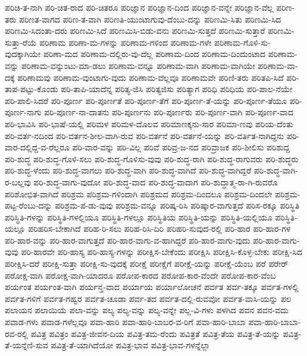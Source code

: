 {ಪರಿಚಿ-ತ-ನಾಗಿ
ಪರಿ-ಚಿತ-ರಾದ
ಪರಿ-ಚಿತರೂ
ಪರಿಜ್ಞಾನ
ಪರಿಜ್ಞಾನ-ದಿಂದ
ಪರಿಜ್ಞಾನ-ವನ್ನೇ
ಪರಿಜ್ಞಾನ-ವೆಲ್ಲ
ಪರಿಣ-ತರು
ಪರಿಣತ-ವಾಗದ
ಪರಿಣ-ತ-ವಾಗಿ
ಪರಿಣತಿ-ಯುಂಟಾಗುವು-ದೆಂಬು-ದನ್ನು
ಪರಿಣಮಿ-ಸಿತು
ಪರಿಣಮಿ-ಸಿದ
ಪರಿಣಮಿ-ಸಿದಂತಾ-ದರು
ಪರಿಣಮಿ-ಸಿದೆ
ಪರಿಣಮಿಸಿ-ಬಿಡು-ವನು
ಪರಿಣಮಿ-ಸುತ್ತದೆ
ಪರಿಣಮಿ-ಸುತ್ತಾರೆ
ಪರಿಣಮಿ-ಸುತ್ತಾ-ರೆಯೆ
ಪರಿಣಾಮ
ಪರಿಣಾ-ಮ-ಗಳನ್ನು
ಪರಿಣಾಮ-ಗಳಿಂದ
ಪರಿಣಾಮ-ಗಳೇ
ಪರಿಣಾಮ-ಗೊಳಿ-ಸು-ವುದಕ್ಕಾಗಿಯೇ
ಪರಿಣಾ-ಮದ
ಪರಿಣಾಮ-ದಲ್ಲಿರು-ವು-ದೆಲ್ಲ
ಪರಿಣಾಮ-ದಿಂದ
ಪರಿಣಾಮ-ದಿಂದುಂಟಾದ
ಪರಿಣಾಮ-ವನ್ನು
ಪರಿಣಾಮ-ವನ್ನುಂಟು-ಮಾ-ಡಲು
ಪರಿಣಾಮ-ವನ್ನೂ
ಪರಿಣಾಮ-ವಾಗಿ
ಪರಿಣಾಮ-ವಾಗಿಯೇ
ಪರಿಣಾಮ-ವಾ-ದಕ್ಕೆ
ಪರಿಣಾಮವು
ಪರಿಣಾಮ-ವುಂಟಾಗು-ವುದು
ಪರಿಣಾಮ-ವೆಲ್ಲವೂ
ಪರಿಣಾಮವೇ
ಪರಿಣಿ-ತರು
ಪರಿತಪಿ-ಸಿದೆ
ಪರಿ-ತಾಪ-ಪಟ್ಟು-ಕೊಂಡು
ಪರಿ-ತಾಪಿ-ಯಾದೆನ್ನ
ಪರಿತ್ಯ-ಜಿಸಿ
ಪರಿತ್ಯಜಿಸು
ಪರಿತ್ಯಾಗ
ಪರಿಧಿ
ಪರಿಧಿಯ
ಪರಿ-ಪಾಲ-ನೆಯೇ
ಪರಿ-ಪಾಲಿ-ಸಿದರೆ
ಪರಿ-ಪೂರ್ಣ
ಪರಿ-ಪೂರ್ಣತೆ
ಪರಿ-ಪೂರ್ಣ-ತೆಗೆ
ಪರಿ-ಪೂರ್ಣ-ತೆ-ಯನ್ನು
ಪರಿ-ಪೂರ್ಣ-ತೆಯೂ
ಪರಿ-ಪೂರ್ಣ-ನಾಗು
ಪರಿ-ಪೂರ್ಣ-ನಾ-ದಾತನು
ಪರಿ-ಪೂರ್ಣನು
ಪರಿ-ಪೂರ್ಣರು
ಪರಿ-ಪೂರ್ಣ-ವಾಗಿ
ಪರಿ-ಪೂರ್ಣ-ವಾದ
ಪರಿ-ಭಾವಿಸಿ
ಪರಿ-ಭಾಷೆ-ಯಲ್ಲಿ
ಪರಿಮಳ
ಪರಿಮಳ-ದೊಲವ
ಪರಿಮಾಣಕ್ಕನು-ಸಾರ
ಪರಿಮಾ-ಣವು
ಪರಿಯ-ದೆಂತು
ಪರಿ-ವರ್ತ-ನದಿಂದ
ಪರಿ-ವರ್ತನ-ಶೀಲ-ವಾಗಿ-ರುವ
ಪರಿ-ವರ್ತನೆ
ಪರಿ-ವರ್ತನೆ-ಯನ್ನು
ಪರಿ-ವರ್ತಿತ-ನಾಗಿದ್ದನು
ಪರಿ-ವಾರ-ದಲ್ಲಿದ್ದ-ವ-ರೆಲ್ಲರೂ
ಪರಿ-ವಾರ-ವನ್ನು
ಪರಿ-ವಿಲ್ಲ
ಪರಿವೆ
ಪರಿವ್ರ-ಜ-ನದ
ಪರಿವ್ರಾಜಕ
ಪರಿ-ಶೀಲಿಸು
ಪರಿಶುದ್ದ
ಪರಿ-ಶುದ್ಧ
ಪರಿ-ಶುದ್ಧ-ಗೊಳಿ-ಸಲು
ಪರಿ-ಶುದ್ಧ-ಗೊಳಿಸು-ವುವು
ಪರಿ-ಶುದ್ಧ-ರಾಗಿ
ಪರಿ-ಶುದ್ಧ-ರಾಗುವರು
ಪರಿ-ಶುದ್ಧರು
ಪರಿ-ಶುದ್ಧ-ಳೆಂದು
ಪರಿ-ಶುದ್ಧ-ವಾಗಲು
ಪರಿ-ಶುದ್ಧ-ವಾಗಿ
ಪರಿ-ಶುದ್ಧ-ವಾಗಿದೆ
ಪರಿ-ಶುದ್ಧ-ವಾಗಿದ್ದರೆ
ಪರಿ-ಶುದ್ಧ-ವಾಗಿ-ರ-ಬಲ್ಲವು
ಪರಿ-ಶುದ್ಧ-ವಾಗು-ವುದೋ
ಪರಿ-ಶುದ್ಧ-ವಾದ
ಪರಿ-ಶುದ್ಧ-ವಾದಾಗ
ಪರಿ-ಶುದ್ಧಾತ್ಮ-ರಾ-ಗಿ-ರುವರೊ
ಪರಿಶೋಭಿತ-ವಾಗಿದೆ
ಪರಿಶ್ರಮ
ಪರಿಶ್ರಮ-ಗಳಿಂದಾಗಿ
ಪರಿಶ್ರಮದ
ಪರಿಶ್ರಮ-ದಿಂದಲೂ
ಪರಿಶ್ರಮ-ದಿಂದಲೇ
ಪರಿಶ್ರಮ-ಪಟ್ಟ-ರೆಂಬು-ದನ್ನು
ಪರಿಶ್ರಮ-ಪ-ಡು-ವುವು
ಪರಿಶ್ರಮ-ವನ್ನೂ
ಪರಿಷ್ಕ-ರಿಸಿ
ಪರಿಷ್ಕಾರ-ವಾಗುತ್ತದೆ
ಪರಿಸ-ರಕ್ಕೂ
ಪರಿಸ್ಥಿತಿ
ಪರಿಸ್ಥಿತಿ-ಗಳನ್ನು
ಪರಿಸ್ಥಿತಿ-ಗಳಲ್ಲಿಯೂ
ಪರಿಸ್ಥಿತಿ-ಗಳಲ್ಲೂ
ಪರಿಸ್ಥಿತಿಯ
ಪರಿಸ್ಥಿತಿ-ಯನ್ನು
ಪರಿಸ್ಥಿತಿ-ಯಲ್ಲಿಯೂ
ಪರಿಸ್ಥಿತಿ-ಯಲ್ಲೂ
ಪರಿಹರಿಸ-ಬೇಕಾಗಿದೆ
ಪರಿಹ-ರಿ-ಸಲು
ಪರಿಹ-ರಿಸಿ-ದಿರಿ
ಪರಿಹರಿ-ಸುವುದ-ರಲ್ಲಿ
ಪರಿ-ಹಾರ
ಪರಿ-ಹಾರ-ಗಳ
ಪರಿ-ಹಾರ-ವನ್ನು
ಪರಿ-ಹಾರ-ವಾಗುತ್ತದೆ
ಪರಿ-ಹಾರ-ವಾಗು-ವ-ಹಾಗಿದ್ದರೆ
ಪರಿ-ಹಾರ-ವಾಗು-ವುದು
ಪರಿ-ಹಾರ-ವಾಗು-ವುವು
ಪರಿ-ಹಾರವೇ
ಪರಿ-ಹಾಸ್ಯ
ಪರಿ-ಹಾಸ್ಯ-ಗಳನ್ನು
ಪರೀಕ್ಷಿಸ-ಬೇಕೆಂದು
ಪರೀಕ್ಷಿಸಿ
ಪರೀಕ್ಷಿಸಿ-ಕೊಳ್ಳ-ಬೇಕು
ಪರೀಕ್ಷಿ-ಸಿದ
ಪರೀಕ್ಷಿಸಿ-ದರೆ
ಪರೀಕ್ಷಿ-ಸುತ್ತಾ
ಪರೀಕ್ಷಿ-ಸು-ವುದಕ್ಕೆ
ಪರೀಕ್ಷೆ
ಪರೀಕ್ಷೆಗೆ
ಪರೀಕ್ಷೆ-ಯನ್ನು
ಪರೀಕ್ಷೆ-ಯೆಂಬ
ಪರೆ
ಪರೇರ್
ಪರೋಕ್ಷ-ವಾಗಿ
ಪರೋಕ್ಷ-ವಾಗಿ-ಯಾದರೂ
ಪರೋಪ-ಕಾರದ
ಪರೋಪ-ಕಾರ-ವೆಂದೇ
ಪರೋಪ-ಕಾರ-ವೆಂಬ
ಪರ್ಯಂತ
ಪರ್ಯಂತ-ವಾಗಿ
ಪರ್ಯನ್ತ-ವಾದ
ಪರ್ಯಾಯ
ಪರ್ಯಾಲೋಚನೆ
ಪರ್ವತ
ಪರ್ವ-ತಕ್ಕೂ
ಪರ್ವತ-ಗಳಲ್ಲಿ
ಪರ್ವತ-ಗಳಿಗೆ
ಪರ್ವತ-ಗಹ್ವರ
ಪರ್ವತ-ಚೂಡಾ
ಪರ್ವ-ತದ
ಪರ್ವತ-ದಲ್ಲಿ-ರುವವೋ
ಪರ್ವತ-ವಾಸಿ-ಯನ್ನು
ಪಲ
ಪಲಾಯನ
ಪಲಾಯಿಯೆ
ಪಲಾ-ವನ್ನು
ಪಲ್ಯ
ಪಲ್ಯ-ವನ್ನು
ಪಲ್ಯ-ವನ್ನೇ
ಪಲ್ಲ-ವಿ-ಗಳು
ಪಳಗಿದ
ಪವನ
ಪವನ-ವದು
ಪವಾಡ-ಗಳು
ಪವಾಡ-ಗಳೆಲ್ಲವೂ
ಪವಾ-ಹಾರಿ
ಪವಾ-ಹಾರಿ-ಬಾಬರ-ವ-ರಿಗೆ
ಪವಾ-ಹಾರಿ-ಬಾಬಾ
ಪವಾ-ಹಾರಿ-ಬಾಬಾ-ರವ-ರಲ್ಲಿ
ಪವಿತ್ರ
ಪವಿತ್ರಂ
ಪವಿತ್ರ-ಜೀವನ-ದಿಯ
ಪವಿತ್ರ-ತಮ-ರೆಂದು
ಪವಿತ್ರತೆ
ಪವಿತ್ರ-ತೆಯ
ಪವಿತ್ರ-ತೆ-ಯನ್ನು
ಪವಿತ್ರ-ತೆ-ಯನ್ನೆಣಿ-ಸುವ
ಪವಿತ್ರ-ತೆ-ಯಾಗಿದೆಯೋ
ಪವಿತ್ರ-ಭಾವ
ಪವಿತ್ರ-ಭಾವ-ಗಳನ್ನೆಲ್ಲಾ
}
